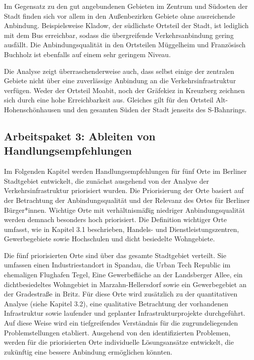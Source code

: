 Im Gegensatz zu den gut angebundenen Gebieten im Zentrum und Südosten der Stadt finden sich vor allem in den Außenbezirken Gebiete ohne ausreichende Anbindung. Beispielsweise Kladow, der südlichste Ortsteil der Stadt, ist lediglich mit dem Bus erreichbar, sodass die übergreifende Verkehrsanbindung gering ausfällt. Die Anbindungsqualität in den Ortsteilen Müggelheim und Französisch Buchholz ist ebenfalls auf einem sehr geringem Niveau.

Die Analyse zeigt überraschenderweise auch, dass selbst einige der zentralen Gebiete nicht über eine zuverlässige Anbindung an die Verkehrsinfrastruktur verfügen. Weder der Ortsteil Moabit, noch der Gräfekiez in Kreuzberg zeichnen sich durch eine hohe Erreichbarkeit aus. Gleiches gilt für den Ortsteil Alt-Hohenschönhausen und den gesamten Süden der Stadt jenseits des S-Bahnrings.

\subsection{Arbeitspaket 3: Ableiten von Handlungsempfehlungen}
\label{arbeitspaket_3_ableiten_von_handlungsempfehlungen}

Im Folgenden Kapitel werden Handlungsempfehlungen für fünf Orte im Berliner Stadtgebiet entwickelt, die zunächst ausgehend von der Analyse der Verkehrsinfrastruktur priorisiert wurden. Die Priorisierung der Orte basiert auf der Betrachtung der Anbindungsqualität und der Relevanz des Ortes für Berliner Bürger*innen. Wichtige Orte mit verhältnismäßig niedriger Anbindungsqualität werden demnach besonders hoch priorisiert. Die Definition wichtiger Orte umfasst, wie in Kapitel 3.1 beschrieben, Handels- und Dienstleistungszentren, Gewerbegebiete sowie Hochschulen und dicht besiedelte Wohngebiete.

Die fünf priorisierten Orte sind über das gesamte Stadtgebiet verteilt. Sie umfassen einen Industriestandort in Spandau, die Urban Tech Republic im ehemaligen Flughafen Tegel, Eine Gewerbefläche an der Landsberger Allee, ein dichtbesiedeltes Wohngebiet in Marzahn-Hellersdorf sowie ein Gewerbegebiet an der Gradestraße in Britz. Für diese Orte wird zusätzlich zu der quantitativen Analyse (siehe Kapitel 3.2), eine qualitative Betrachtung der vorhandenen Infrastruktur sowie laufender und geplanter Infrastrukturprojekte durchgeführt. Auf diese Weise wird ein tiefgreifendes Verständnis für die zugrundeliegenden Problemstellungen etabliert. Ausgehend von den identifizierten Problemen, werden für die priorisierten Orte individuelle Lösungsansätze entwickelt, die zukünftig eine bessere Anbindung ermöglichen könnten.

